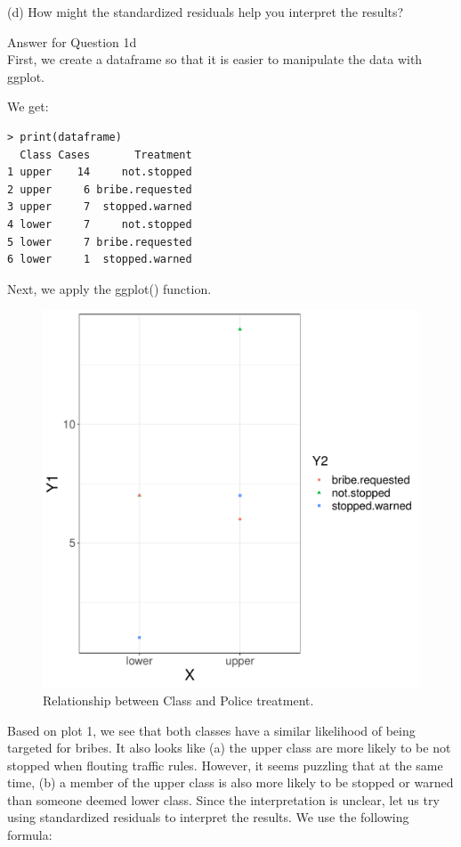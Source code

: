 \documentclass[12pt,letterpaper]{article}
\begin{document}
	\vspace{7cm}
	\item [(d)] How might the standardized residuals help you interpret the results?  
	
			\item
Answer for Question 1d\\
\noindent First, we create a dataframe so that it is easier to manipulate the data with ggplot.\\
\vspace{.5cm}
  
\vspace{.5cm}
\noindent We get:\\
\begin{verbatim}
> print(dataframe)
  Class Cases       Treatment
1 upper    14     not.stopped
2 upper     6 bribe.requested
3 upper     7  stopped.warned
4 lower     7     not.stopped
5 lower     7 bribe.requested
6 lower     1  stopped.warned
\end{verbatim}
\noindent Next, we apply the ggplot() function.\\
\vspace{.5cm}
  
\vspace{.5cm}
\begin{figure}[hbtp!]\centering
	\caption{\footnotesize Relationship between Class and Police treatment.}
	\label{fig:plot_1}
	\includegraphics[width=.75\textwidth]{plot_class_treatment.pdf}
\end{figure}
\noindent Based on plot 1, we see that both classes have a similar likelihood of being targeted for bribes. It also looks like (a) the upper class are more likely to be not stopped when flouting traffic rules. However, it seems puzzling that at the same time, (b) a member of the upper class is also more likely to be stopped or warned than someone deemed lower class. Since the interpretation is unclear, let us try using standardized residuals to interpret the results. We use the following formula:\\
\end{document}
